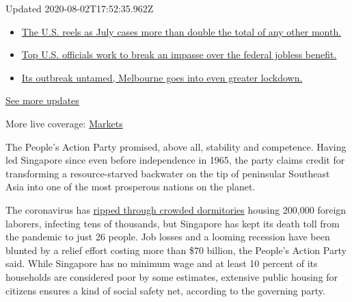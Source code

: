 Updated 2020-08-02T17:52:35.962Z

\begin{itemize}
\tightlist
\item
  \href{https://www.nytimes3xbfgragh.onion/2020/08/01/world/coronavirus-covid-19.html?action=click\&pgtype=Article\&state=default\&region=MAIN_CONTENT_1\&context=storylines_live_updates\#link-34047410}{The
  U.S. reels as July cases more than double the total of any other
  month.}
\item
  \href{https://www.nytimes3xbfgragh.onion/2020/08/01/world/coronavirus-covid-19.html?action=click\&pgtype=Article\&state=default\&region=MAIN_CONTENT_1\&context=storylines_live_updates\#link-780ec966}{Top
  U.S. officials work to break an impasse over the federal jobless
  benefit.}
\item
  \href{https://www.nytimes3xbfgragh.onion/2020/08/01/world/coronavirus-covid-19.html?action=click\&pgtype=Article\&state=default\&region=MAIN_CONTENT_1\&context=storylines_live_updates\#link-2bc8948}{Its
  outbreak untamed, Melbourne goes into even greater lockdown.}
\end{itemize}

\href{https://www.nytimes3xbfgragh.onion/2020/08/01/world/coronavirus-covid-19.html?action=click\&pgtype=Article\&state=default\&region=MAIN_CONTENT_1\&context=storylines_live_updates}{See
more updates}

More live coverage:
\href{https://www.nytimes3xbfgragh.onion/live/2020/07/31/business/stock-market-today-coronavirus?action=click\&pgtype=Article\&state=default\&region=MAIN_CONTENT_1\&context=storylines_live_updates}{Markets}

The People's Action Party promised, above all, stability and competence.
Having led Singapore since even before independence in 1965, the party
claims credit for transforming a resource-starved backwater on the tip
of peninsular Southeast Asia into one of the most prosperous nations on
the planet.

The coronavirus has
\href{https://www.nytimes3xbfgragh.onion/2020/04/20/world/asia/coronavirus-singapore.html}{ripped
through crowded dormitories} housing 200,000 foreign laborers, infecting
tens of thousands, but Singapore has kept its death toll from the
pandemic to just 26 people. Job losses and a looming recession have been
blunted by a relief effort costing more than \$70 billion, the People's
Action Party said. While Singapore has no minimum wage and at least 10
percent of its households are considered poor by some estimates,
extensive public housing for citizens ensures a kind of social safety
net, according to the governing party.

